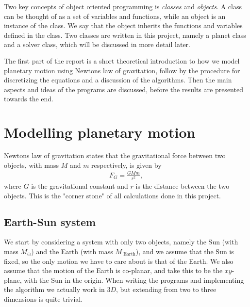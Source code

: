 \documentclass[12pt, a4paper]{article}
\begin{document}
Two key concepts of object oriented programming is \textit{classes} and \textit{objects}. A class can be 
thought of as a set of variables and functions, while an object is an instance of the class. We 
say that the object inherits the functions and variables defined in the class. Two classes are written in 
this project, namely a planet class and a solver class, which will be discussed in more detail later. 

The first part of the report is a short theoretical introduction to how we model planetary motion using 
Newtons law of gravitation, follow by the procedure for discretizing the equations and a discussion of 
the algorithms. Then the main aspects and ideas of the programs are discussed, before the results are 
presented towards the end.  

\section{Modelling planetary motion}

Newtons law of gravitation states that the gravitational force between two objects, with mass $M$ and $m$
respectively, is given by 
\begin{align}
F_G = \frac{GMm}{r^2}, 
\end{align}
where $G$ is the gravitational constant and $r$ is the distance between the two objects. This is 
the "corner stone" of all calculations done in this project. 

\subsection{Earth-Sun system}

We start by considering a system with only two objects, namely the Sun (with mass $M_{\odot}$) and the 
Earth (with mass $M_{\text{ Earth}}$), and we assume that the Sun is fixed, so the only motion we have to
care about is that of the Earth. We also assume that the motion of the Earth is co-planar, and take this 
to be the $xy$-plane, with the Sun in the origin. When writing the programs and implementing the 
algorithm we actually work in $3D$, but extending from two to three dimensions is quite trivial.  
\end{document}

